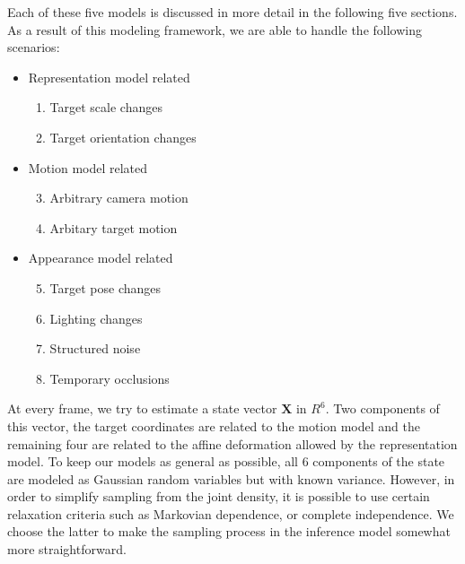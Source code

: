 Each of these five models is discussed in more detail in the following five sections.  As a result of this modeling framework, we are able to handle the following scenarios:

\begin{itemize}
\item Representation model related
\begin{enumerate}
\item Target scale changes
\item Target orientation changes
\end{enumerate}
\item Motion model related
\begin{enumerate}\setcounter{enumi}{2}
\item Arbitrary camera motion
\item Arbitary target motion
\end{enumerate}
\item Appearance model related
\begin{enumerate}\setcounter{enumi}{4}
\item Target pose changes
\item Lighting changes
\item Structured noise
\item Temporary occlusions
\end{enumerate}
\end{itemize}



At every frame, we try to estimate a state vector $\mathbf{X}$ in $R^6$.  Two components of this vector, the target coordinates are related to the motion model and the remaining four are related to the affine deformation allowed by the representation model.  To keep our models as general as possible, all 6 components of the state are modeled as Gaussian random variables but with known variance.  However, in order to simplify sampling from the joint density, it is possible to use certain relaxation criteria such as Markovian dependence, or complete independence.  We choose the latter to make the sampling process in the inference model somewhat more straightforward.

